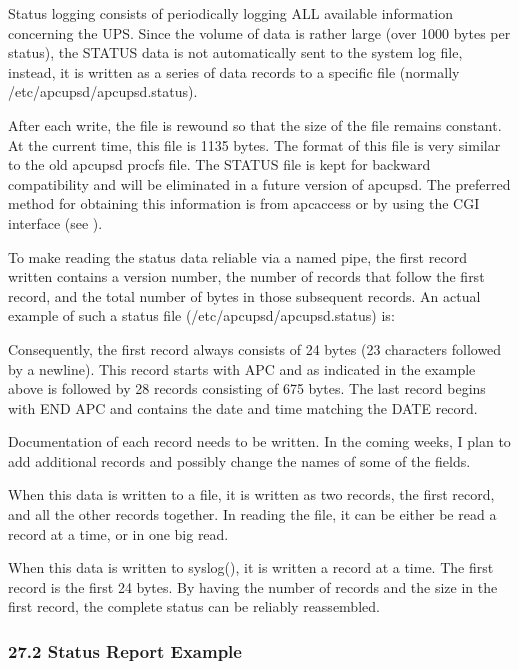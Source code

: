 Status logging consists of periodically logging ALL available information
concerning the UPS. Since the volume of data is rather large (over 1000 bytes
per status), the STATUS data is not automatically sent to the system log file,
instead, it is written as a series of data records to a specific file
(normally /etc/apcupsd/apcupsd.status).  

After each write, the file is rewound so that the size of the file remains
constant. At the current time, this file is 1135 bytes. The format of this
file is very similar to the old apcupsd procfs file. The STATUS file is kept
for backward compatibility and will be eliminated in a future version of
apcupsd. The preferred method for obtaining this information is from apcaccess
or by using the CGI interface (see 
).  

To make reading the status data reliable via a named pipe, the first record
written contains a version number, the number of records that follow the first
record, and the total number of bytes in those subsequent records. An actual
example of such a status file (/etc/apcupsd/apcupsd.status) is:  

Consequently, the first record always consists of 24 bytes (23 characters
followed by a newline). This record starts with APC and as indicated in the
example above is followed by 28 records consisting of 675 bytes. The last
record begins with END APC and contains the date and time matching the DATE
record.  

Documentation of each record needs to be written. In the coming weeks, I plan
to add additional records and possibly change the names of some of the fields.
 

When this data is written to a file, it is written as two records, the first
record, and all the other records together. In reading the file, it can be
either be read a record at a time, or in one big read.  

When this data is written to syslog(), it is written a record at a time. The
first record is the first 24 bytes. By having the number of records and the
size in the first record, the complete status can be reliably reassembled. 

\label{Status-Report-Example}

\subsubsection*{27.2 Status Report Example}


